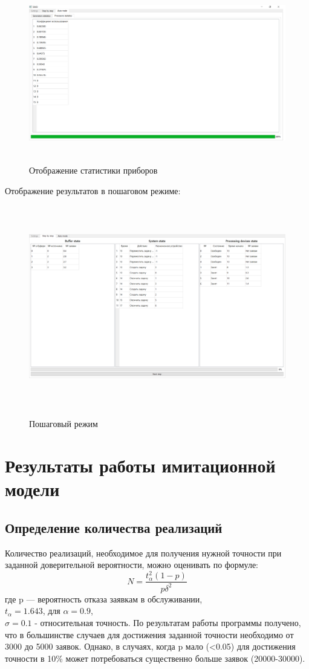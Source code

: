 \documentclass{article}
\begin{document}
	\begin{figure}[!htbp]
		\centering
		\includegraphics[width=\textwidth,height=200pt,keepaspectratio]{auto_2.png}\\
		\caption{Отображение статистики приборов}
	\end{figure}
	\newpage
	Отображение результатов в пошаговом режиме:	
	\begin{figure}[!htbp]
		\centering
		\includegraphics[width=\textwidth,height=250pt,keepaspectratio]{man_1.png}\\
		\caption{Пошаговый режим}
	\end{figure}
	\clearpage
	\section{Результаты работы имитационной модели}
	\subsection{Определение количества реализаций}
	\flushleft
	Количество реализаций, необходимое для получения нужной точности при заданной доверительной вероятности, можно оценивать
	по формуле:
	\begin{equation*}
		N=\frac{t^2_\alpha(1-p)}{p\delta^2}
	\end{equation*}
	где p — вероятность отказа заявкам в обслуживании,\\
	$t_\alpha=1.643$, для $\alpha = 0.9$,\\
	$\sigma=0.1$ - относительная точность.
	По результатам работы программы получено, что в большинстве
	случаев для достижения заданной точности необходимо от 3000 до
	5000 заявок. Однако, в случаях, когда p мало (<0.05) для достижения
	точности в 10\% может потребоваться существенно больше заявок
	(20000-30000).
\end{document}
